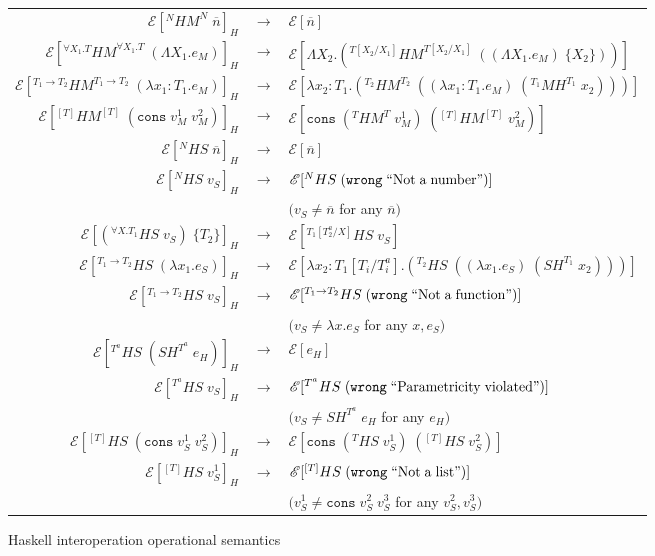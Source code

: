 \begin{figure}
\onehalfspacing
\begin{center}
\begin{tabular}{rcl}
$\mathscr{E}[^{N}HM^{N}\;\overline{n}]_{H}$ & $\rightarrow$ & $\mathscr{E}[\overline{n}]$ \\
$\mathscr{E}[^{\forall X_{1}.T}HM^{\forall X_{1}.T}\;(\Lambda X_{1}.e_{M})]_{H}$ & $\rightarrow$ & $\mathscr{E}[\Lambda X_{2}.(^{T[X_{2}/X_{1}]}HM^{T[X_{2}/X_{1}]}\;((\Lambda X_{1}.e_{M})\;\lbrace X_{2}\rbrace))]$ \\
$\mathscr{E}[^{T_{1}\rightarrow T_{2}}HM^{T_{1}\rightarrow T_{2}}\;(\lambda x_{1}:T_{1}.e_{M})]_{H}$ & $\rightarrow$ & $\mathscr{E}[\lambda x_{2}:T_{1}.(^{T_{2}}HM^{T_{2}}\;((\lambda x_{1}:T_{1}.e_{M})\;(^{T_{1}}MH^{T_{1}}\;x_{2})))]$ \\
$\mathscr{E}[^{[T]}HM^{[T]}\;(\mathtt{cons}\;v_{M}^{1}\;v_{M}^{2})]_{H}$ & $\rightarrow$ & $\mathscr{E}[\mathtt{cons}\;(^{T}HM^{T}\;v_{M}^{1})\;(^{[T]}HM^{[T]}\;v_{M}^{2})]$ \\
$\mathscr{E}[^{N}HS\;\overline{n}]_{H}$ & $\rightarrow$ & $\mathscr{E}[\overline{n}]$ \\
$\mathscr{E}[^{N}HS\;v_{S}]_{H}$ & $\rightarrow$ & $\mathscr{E}[^{N}HS\;(\mathtt{wrong}\;\mathrm{``Not\;a\;number"})]$ \\
&& $(v_{S}\neq\overline{n}$ for any $\overline{n})$ \\
$\mathscr{E}[(^{\forall X.T_{1}}HS\;v_{S})\;\lbrace T_{2}\rbrace]_{H}$ & $\rightarrow$ & $\mathscr{E}[^{T_{1}[T^{a}_{2}/X]}HS\;v_{S}]$ \\
$\mathscr{E}[^{T_{1}\rightarrow T_{2}}HS\;(\lambda x_{1}.e_{S})]_{H}$ & $\rightarrow$ & $\mathscr{E}[\lambda x_{2}:T_{1}[T_{i}/T^{a}_{i}].(^{T_{2}}HS\;((\lambda x_{1}.e_{S})\;(SH^{T_{1}}\;x_{2})))]$ \\
$\mathscr{E}[^{T_{1}\rightarrow T_{2}}HS\;v_{S}]_{H}$ & $\rightarrow$ & $\mathscr{E}[^{T_{1}\rightarrow T_{2}}HS\;(\mathtt{wrong}\;\mathrm{``Not\;a\;function"})]$ \\
&& $(v_{S}\neq\lambda x.e_{S}$ for any $x,e_{S})$ \\
$\mathscr{E}[^{T^{a}}HS\;(SH^{T^{a}}\;e_{H})]_{H}$ & $\rightarrow$ & $\mathscr{E}[e_{H}]$ \\
$\mathscr{E}[^{T^{a}}HS\;v_{S}]_{H}$ & $\rightarrow$ & $\mathscr{E}[^{T^{a}}HS\;(\mathtt{wrong}\;\mathrm{``Parametricity\;violated"})]$ \\
&& $(v_{S}\neq SH^{T^{a}}\;e_{H}$ for any $e_{H})$ \\
$\mathscr{E}[^{[T]}HS\;(\mathtt{cons}\;v_{S}^{1}\;v_{S}^{2})]_{H}$ & $\rightarrow$ & $\mathscr{E}[\mathtt{cons}\;(^{T}HS\;v_{S}^{1})\;(^{[T]}HS\;v_{S}^{2})]$ \\
$\mathscr{E}[^{[T]}HS\;v_{S}^{1}]_{H}$ & $\rightarrow$ & $\mathscr{E}[^{[T]}HS\;(\mathtt{wrong}\;\mathrm{``Not\;a\;list"})]$ \\
&& $(v_{S}^{1}\neq\mathtt{cons}\;v_{S}^{2}\;v_{S}^{3}$ for any $v_{S}^{2},v_{S}^{3})$
\end{tabular}
\end{center}
\caption{Haskell interoperation operational semantics}
\label{fig:hios}
\end{figure}